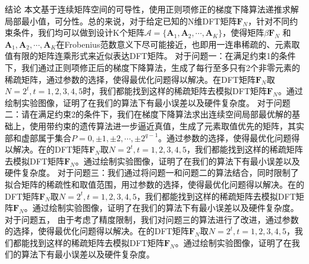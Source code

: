 \documentclass[11pt]{article}
\begin{document}
\begin{section}{结论}
 本文基于连续矩阵空间的可导性，使用正则项修正的梯度下降算法递推求解局部最小值，可分性。总的来说，对于给定已知的N维DFT矩阵$\mathbf{F}_N$，针对不同约束条件，我们均可以做到设计K个矩阵$\mathcal{A}=\{\mathbf{A}_1,\mathbf{A}_2,\cdots,\mathbf{A}_K\}$，使得矩阵$β\mathbf{F}_N$ 和$\mathbf{A}_1, \mathbf{A}_2,\cdots,\mathbf{A}_K$在Frobenius范数意义下尽可能接近，也即用一连串稀疏的、元素取值有限的矩阵连乘形式来近似表达DFT矩阵。
 对于问题一：在满足约束1的条件下，我们通过正则项修正后的梯度下降算法，生成了每行至多只有2个非零元素的稀疏矩阵，通过参数的选择，使得最优化问题得以解决。在DFT矩阵$\mathbf{F}_N$取$N=2^t,t=1,2,3,4,5$时，我们都能找到这样的稀疏矩阵去模拟DFT矩阵$\mathbf{F}_N$。通过绘制实验图像，证明了在我们的算法下有最小误差以及硬件复杂度。
 对于问题二：请在满足约束2的条件下，我们在梯度下降算法求出连续空间局部最优解的基础上，使用带约束的遗传算法进一步逼近真值，生成了元素取值优先的矩阵，其实部和虚部属于集合$P={0,\pm1,\pm2,\cdots,\pm2^{q-1} }$。通过参数的选择，使得最优化问题得以解决。在的DFT矩阵$\mathbf{F}_N$取$N=2^t,t=1,2,3,4,5$，我们都能找到这样的稀疏矩阵去模拟DFT矩阵$\mathbf{F}_N$。通过绘制实验图像，证明了在我们的算法下有最小误差以及硬件复杂度。
 对于问题三：我们通过将问题一和问题二的算法结合，同时限制了拟合矩阵的稀疏性和取值范围，用过参数的选择，使得最优化问题得以解决。在的DFT矩阵$\mathbf{F}_N$取$N=2^t,t=1,2,3,4,5$，我们都能找到这样的稀疏矩阵去模拟DFT矩阵$\mathbf{F}_N$。通过绘制实验图像，证明了在我们的算法下有最小误差以及硬件复杂度。
 对于问题五， 由于考虑了精度限制，我们对问题三的算法进行了改进，通过参数的选择，使得最优化问题得以解决。在的DFT矩阵$\mathbf{F}_N$取$N=2^t,t=1,2,3,4,5$，我们都能找到这样的稀疏矩阵去模拟DFT矩阵$\mathbf{F}_N$。通过绘制实验图像，证明了在我们的算法下有最小误差以及硬件复杂度。
\end{section}
\newpage
\printbibliography[heading=bibliography,title=\centering 参考文献]
\newpage
\end{document}
